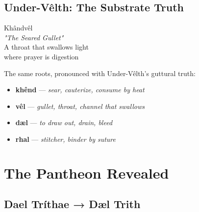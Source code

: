 \documentclass[11pt,a4paper,twoside]{book}
\newcommand{\fadetext}[1]{%
    \textcolor{black!30}{#1}%
}
\begin{document}
\begin{center}
\end{center}

\section{Under-Vêlth: The Substrate Truth}

\begin{tcolorbox}[horrorbox={The Revelation}]
\centering
\runefont\large
Khândvêl\\
\normalfont\textit{"The Seared Gullet"}\\
\vspace{1em}
A throat that swallows light\\
where prayer is digestion
\end{tcolorbox}

The same roots, pronounced with Under-Vêlth's guttural truth:
\begin{itemize}
    \item \textbf{khênd} — \textit{sear, cauterize, consume by heat}
    \item \textbf{vêl} — \textit{gullet, throat, channel that swallows}
    \item \textbf{dæl} — \textit{to draw out, drain, bleed}
    \item \textbf{rhal} — \textit{stitcher, binder by suture}
\end{itemize}

\chapter{The Pantheon Revealed}

\section{Dael Tríthae → Dæl Trith}
\end{document}
